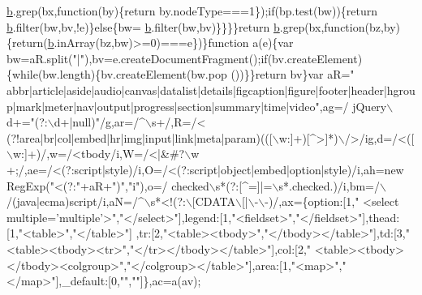 \begin{DoxyCode}
      \hyperlink{jquery_8js_aa4026ad5544b958e54ce5e106fa1c805}{b}.grep(bx,\textcolor{keyword}{function}(by)\{\textcolor{keywordflow}{return} by.nodeType===1\});\textcolor{keywordflow}{if}(bp.test(bw))\{\textcolor{keywordflow}{return} \hyperlink{jquery_8js_aa4026ad5544b958e54ce5e106fa1c805}{b}.filter(bw,bv,!e)\}\textcolor{keywordflow}{else}\{bw=
      \hyperlink{jquery_8js_aa4026ad5544b958e54ce5e106fa1c805}{b}.filter(bw,bv)\}\}\}\}\textcolor{keywordflow}{return} \hyperlink{jquery_8js_aa4026ad5544b958e54ce5e106fa1c805}{b}.grep(bx,\textcolor{keyword}{function}(bz,by)\{\textcolor{keywordflow}{return}(\hyperlink{jquery_8js_aa4026ad5544b958e54ce5e106fa1c805}{b}.inArray(bz,bw)>=0)===e\})\}\textcolor{keyword}{function} a(e)\{var 
      bw=aR.split(\textcolor{stringliteral}{"|"}),bv=e.createDocumentFragment();\textcolor{keywordflow}{if}(bv.createElement)\{\textcolor{keywordflow}{while}(bw.length)\{bv.createElement(bw.pop
      ())\}\}\textcolor{keywordflow}{return} bv\}var aR=\textcolor{stringliteral}{"
      abbr|article|aside|audio|canvas|datalist|details|figcaption|figure|footer|header|hgroup|mark|meter|nav|output|progress|section|summary|time|video"},ag=/ jQuery\(\backslash\)d+=\textcolor{stringliteral}{"(?:\(\backslash\)d+|null)"}/g,ar=/^\(\backslash\)s+/,R=/<
      (?!area|br|col|embed|hr|img|input|link|meta|param)(([\(\backslash\)w:]+)[^>]*)\(\backslash\)/>/ig,d=/<([\(\backslash\)w:]+)/,w=/<tbody/i,W=/<|&#?\(\backslash\)w
      +;/,ae=/<(?:script|style)/i,O=/<(?:script|\textcolor{keywordtype}{object}|embed|option|style)/i,ah=\textcolor{keyword}{new} RegExp(\textcolor{stringliteral}{"<(?:"}+aR+\textcolor{stringliteral}{")"},\textcolor{stringliteral}{"i"}),o=/
      checked\(\backslash\)s*(?:[^=]|=\(\backslash\)s*.checked.)/i,bm=/\(\backslash\)/(java|ecma)script/i,aN=/^\(\backslash\)s*<!(?:\(\backslash\)[CDATA\(\backslash\)[|\(\backslash\)-\(\backslash\)-)/,ax=\{option:[1,\textcolor{stringliteral}{"
      <select multiple='multiple'>"},\textcolor{stringliteral}{"</select>"}],legend:[1,\textcolor{stringliteral}{"<fieldset>"},\textcolor{stringliteral}{"</fieldset>"}],thead:[1,\textcolor{stringliteral}{"<table>"},\textcolor{stringliteral}{"</table>"}]
      ,tr:[2,\textcolor{stringliteral}{"<table><tbody>"},\textcolor{stringliteral}{"</tbody></table>"}],td:[3,\textcolor{stringliteral}{"<table><tbody><tr>"},\textcolor{stringliteral}{"</tr></tbody></table>"}],col:[2,\textcolor{stringliteral}{"
      <table><tbody></tbody><colgroup>"},\textcolor{stringliteral}{"</colgroup></table>"}],area:[1,\textcolor{stringliteral}{"<map>"},\textcolor{stringliteral}{"</map>"}],\_default:[0,\textcolor{stringliteral}{""},\textcolor{stringliteral}{""}]\},ac=a(av);

\end{DoxyCode}
